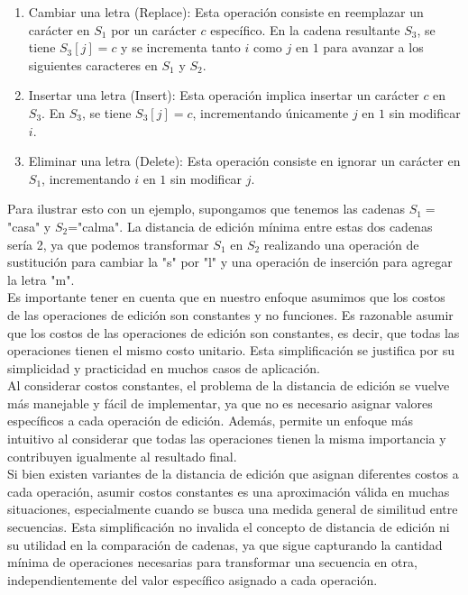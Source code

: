 \begin{enumerate}
    \item Cambiar una letra (Replace): Esta operación consiste en reemplazar un carácter en \(S_{1}\) por un carácter \(c\) específico.  En la cadena resultante \(S_{3}\), se tiene \(S_{3}[j]=c\) y se incrementa tanto \(i\) como \(j\) en \(1\) para avanzar a los siguientes caracteres en \(S_{1}\) y \(S_{2}\).
    \item Insertar una letra (Insert): Esta operación implica insertar un carácter \(c\) en \(S_{3}\). En \(S_{3}\), se tiene \(S_{3}[j]=c\), incrementando únicamente \(j\) en \(1\) sin modificar \(i\).\
    \item Eliminar una letra (Delete): Esta operación consiste en ignorar un carácter en \(S_{1}\), incrementando \(i\) en \(1\) sin modificar \(j\).
\end{enumerate}

Para ilustrar esto con un ejemplo, supongamos que tenemos las cadenas \(S_{1}=\)"casa" y \(S_{2}\)="calma". La distancia de edición mínima entre estas dos cadenas sería 2, ya que podemos transformar \(S_{1}\) en \(S_{2}\) realizando una operación de sustitución para cambiar la "s" por "l" y una operación de inserción para agregar la letra "m".\\

Es importante tener en cuenta que en nuestro enfoque asumimos que los costos de las operaciones de edición son constantes y no funciones. Es razonable asumir que los costos de las operaciones de edición son constantes, es decir, que todas las operaciones tienen el mismo costo unitario. Esta simplificación se justifica por su simplicidad y practicidad en muchos casos de aplicación.\\

Al considerar costos constantes, el problema de la distancia de edición se vuelve más manejable y fácil de implementar, ya que no es necesario asignar valores específicos a cada operación de edición. Además, permite un enfoque más intuitivo al considerar que todas las operaciones tienen la misma importancia y contribuyen igualmente al resultado final.\\

Si bien existen variantes de la distancia de edición que asignan diferentes costos a cada operación, asumir costos constantes es una aproximación válida en muchas situaciones, especialmente cuando se busca una medida general de similitud entre secuencias. Esta simplificación no invalida el concepto de distancia de edición ni su utilidad en la comparación de cadenas, ya que sigue capturando la cantidad mínima de operaciones necesarias para transformar una secuencia en otra, independientemente del valor específico asignado a cada operación.